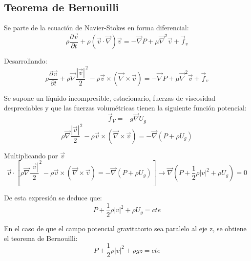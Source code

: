 \subsection{Teorema de Bernouilli}
Se parte de la ecuación de Navier-Stokes en forma diferencial:
\[\rho\frac{\partial \vec{v}}{\partial t}+\rho\left(\vec{v}\cdot\vec{\nabla}\right)\vec{v}=-\vec{\nabla}P+\mu\vec{\nabla}^2\vec{v}+ \vec{f}_v\]

Desarrollando:
\[\rho\frac{\partial \vec{v}}{\partial t}
+
\rho\vec{\nabla}\frac{|\vec{v}|}{2}^2-\rho\vec{v} \times \left(\vec{\nabla}\times\vec{v}\right)
=-\vec{\nabla}P+\mu\vec{\nabla}^2\vec{v}+\vec{f}_v
\]

Se supone un líquido incompresible, estacionario, fuerzas de viscosidad despreciables y que las fuerzas volumétricas tienen la siguiente función potencial:
\[\vec{f}_V=-g\vec{\nabla}U_g\]
\[\rho\vec{\nabla}\frac{|\vec{v}|}{2}^2
-
\rho\vec{v} \times \left(\vec{\nabla}\times\vec{v}\right)
=
-\vec{\nabla}\left(P+\rho U_g\right)\]

Multiplicando por $\vec{v}$
\[\vec{v}\cdot\left[\rho\vec{\nabla}\frac{|\vec{v}|}{2}^2
-
\rho\vec{v} \times \left(\vec{\nabla}\times\vec{v}\right)
=
-\vec{\nabla}\left(P+\rho U_g\right)\right]\rightarrow\vec{\nabla}\left(P+\frac{1}{2}\rho|v|^2+\rho U_g\right)=0\]

De esta expresión se deduce que:
\[P+\frac{1}{2}\rho|v|^2+\rho U_g=cte\]

En el caso de que el campo potencial gravitatorio sea paralelo al eje z, se obtiene el teorema de Bernouilli:
\[P+\frac{1}{2}\rho|v|^2+\rho gz=cte\]